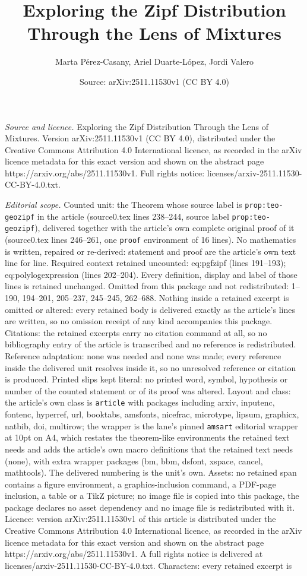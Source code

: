 \documentclass[10pt,a4paper]{amsart}
\title[Exploring the Zipf Distribution Through the Lens of Mixtures]{Exploring the Zipf Distribution Through the Lens of Mixtures}
\author{Marta P\'erez-Casany, Ariel Duarte-L\'opez, Jordi Valero}
\date{Source: arXiv:2511.11530v1 (CC BY 4.0)}
\begin{document}
\maketitle

\noindent\emph{Source and licence.} Exploring the Zipf Distribution Through the Lens of Mixtures. Version arXiv:2511.11530v1 (CC BY 4.0), distributed under the Creative Commons Attribution 4.0 International licence, as recorded in the arXiv licence metadata for this exact version and shown on the abstract page https://arxiv.org/abs/2511.11530v1. Full rights notice: licenses/arxiv-2511.11530-CC-BY-4.0.txt.\par\smallskip

\noindent\textit{Editorial scope.} Counted unit: the Theorem whose source label is \texttt{prop:teo-geozipf} in the article (source0.tex lines 238--244, source label \texttt{prop:teo-geozipf}), delivered together with the article's own complete original proof of it (source0.tex lines 246--261, one \texttt{proof} environment of 16 lines). No mathematics is written, repaired or re-derived: statement and proof are the article's own text line for line. Required context retained uncounted: eq:pgfzipf (lines 191--193); eq:polylogexpression (lines 202--204). Every definition, display and label of those lines is retained unchanged. Omitted from this package and not redistributed: 1--190, 194--201, 205--237, 245--245, 262--688. Nothing inside a retained excerpt is omitted or altered: every retained body is delivered exactly as the article's lines are written, so no omission receipt of any kind accompanies this package. Citations: the retained excerpts carry no citation command at all, so no bibliography entry of the article is transcribed and no reference is redistributed. Reference adaptation: none was needed and none was made; every reference inside the delivered unit resolves inside it, so no unresolved reference or citation is produced. Printed slips kept literal: no printed word, symbol, hypothesis or number of the counted statement or of its proof was altered. Layout and class: the article's own class is \texttt{article} with packages including arxiv, inputenc, fontenc, hyperref, url, booktabs, amsfonts, nicefrac, microtype, lipsum, graphicx, natbib, doi, multirow; the wrapper is the lane's pinned \texttt{amsart} editorial wrapper at 10pt on A4, which restates the theorem-like environments the retained text needs and adds the article's own macro definitions that the retained text needs (none), with extra wrapper packages (bm, bbm, dsfont, xspace, cancel, mathtools). The delivered numbering is the unit's own. Assets: no retained span contains a figure environment, a graphics-inclusion command, a PDF-page inclusion, a table or a TikZ picture; no image file is copied into this package, the package declares no asset dependency and no image file is redistributed with it. Licence: version arXiv:2511.11530v1 of this article is distributed under the Creative Commons Attribution 4.0 International licence, as recorded in the arXiv licence metadata for this exact version and shown on the abstract page https://arxiv.org/abs/2511.11530v1. A full rights notice is delivered at licenses/arxiv-2511.11530-CC-BY-4.0.txt. Characters: every retained excerpt is 
\end{document}
